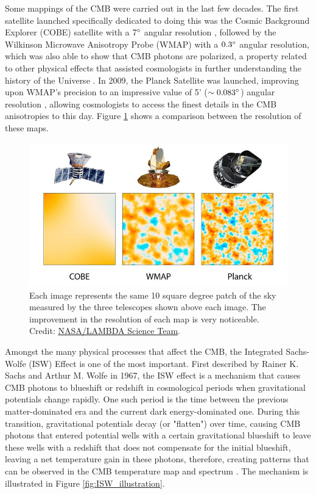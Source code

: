 \documentclass[openany,a4paper,12pt,oneside]{book}
\begin{document}
\begin{spacing}{1.5}
Some mappings of the CMB were carried out in the last few decades. The first satellite launched specifically dedicated to doing this was the Cosmic Background Explorer (COBE) satellite with a $7\degree$ angular resolution \cite{COBE}, followed by the Wilkinson Microwave Anisotropy Probe (WMAP) with a $0.3\degree$ angular resolution, which was also able to show that CMB photons are polarized, a property related to other physical effects that assisted cosmologists in further understanding the history of the Universe \cite{polarization_1997, polarization_2014, BMode_constraints}. In 2009, the Planck Satellite was launched, improving upon WMAP's precision to an impressive value of 5' ($\sim 0.083\degree$) angular resolution \cite{theplanckcollaboration2006scientific}, allowing cosmologists to access the finest details in the CMB anisotropies to this day. Figure \ref{fig:cmb_satellites} shows a comparison between the resolution of these maps.

\begin{figure}
    \centering
    \includegraphics[width=.9\linewidth]{Imagens/satellites.jpg}
    \caption{Each image represents the same 10 square degree patch of the sky measured by the three telescopes shown above each image. The improvement in the resolution of each map is very noticeable. Credit: \href{https://lambda.gsfc.nasa.gov/education/graphic_history/microwaves.html}{NASA/LAMBDA Science Team}.}
    \label{fig:cmb_satellites}
\end{figure}

Amongst the many physical processes that affect the CMB, the Integrated Sachs-Wolfe (ISW) Effect is one of the most important. First described by Rainer K. Sachs and Arthur M. Wolfe in 1967, the ISW effect is a mechanism that causes CMB photons to blueshift or redshift in cosmological periods when gravitational potentials change rapidly. One such period is the time between the previous matter-dominated era and the current dark energy-dominated one. During this transition, gravitational potentials decay (or "flatten") over time, causing CMB photons that entered potential wells with a certain gravitational blueshift to leave these wells with a redshift that does not compensate for the initial blueshift, leaving a net temperature gain in these photons, therefore, creating patterns that can be observed in the CMB temperature map and spectrum \cite{Sachs:1967er}. The mechanism is illustrated in Figure \ref{fig:ISW_illustration}.


\end{spacing}
\end{document}
